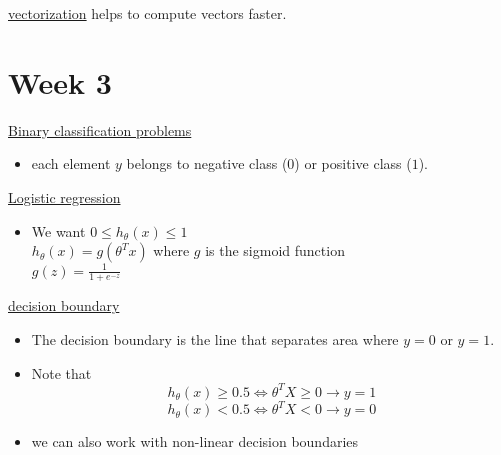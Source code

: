\documentclass[12pt]{article}
\begin{document}
\underline{vectorization} helps to compute vectors faster.

\section*{Week 3}

\underline{Binary classification problems}
\begin{itemize}
	\item each element $y$ belongs to negative class ($0$) or positive class ($1$).
\end{itemize}

\underline{Logistic regression}
	\begin{itemize}
		\item We want $0\leq h_\theta(x) \leq 1$\\
		$h_\theta(x) = g(\theta^Tx)$ where $g$ is the sigmoid function\\
		$g(z) = \frac{1}{1+e^{-z}}$
	\end{itemize}

\underline{decision boundary}
\begin{itemize}

\item The decision boundary is the line that separates area where $y=0$ or $y=1$.
\item Note that 
\[h_\theta(x)\geq0.5\iff \theta^TX\geq 0 \to y=1\]
\[h_\theta(x)<0.5\iff \theta^TX< 0 \to y=0\]
	\item we can also work with non-linear decision boundaries
\end{itemize}
\end{document}
